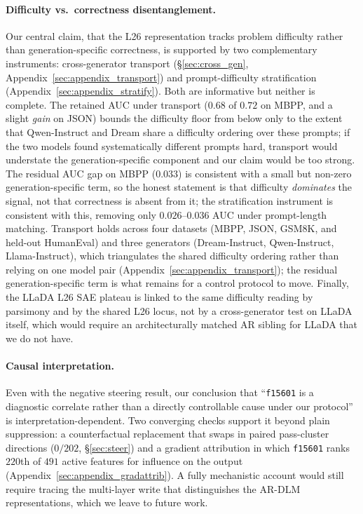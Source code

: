 \documentclass[11pt]{article}
\begin{document}
\paragraph{Difficulty vs.\ correctness disentanglement.}
Our central claim, that the L26 representation tracks problem difficulty rather than generation-specific correctness, is supported by two complementary instruments: cross-generator transport (\S\ref{sec:cross_gen}, Appendix~\ref{sec:appendix_transport}) and prompt-difficulty stratification (Appendix~\ref{sec:appendix_stratify}).
Both are informative but neither is complete.
The retained AUC under transport ($0.68$ of $0.72$ on MBPP, and a slight \emph{gain} on JSON) bounds the difficulty floor from below only to the extent that Qwen-Instruct and Dream share a difficulty ordering over these prompts; if the two models found systematically different prompts hard, transport would understate the generation-specific component and our claim would be too strong.
The residual AUC gap on MBPP ($0.033$) is consistent with a small but non-zero generation-specific term, so the honest statement is that difficulty \emph{dominates} the signal, not that correctness is absent from it; the stratification instrument is consistent with this, removing only $0.026$--$0.036$ AUC under prompt-length matching.
Transport holds across four datasets (MBPP, JSON, GSM8K, and held-out HumanEval) and three generators (Dream-Instruct, Qwen-Instruct, Llama-Instruct), which triangulates the shared difficulty ordering rather than relying on one model pair (Appendix~\ref{sec:appendix_transport}); the residual generation-specific term is what remains for a control protocol to move.
Finally, the LLaDA L26 SAE plateau is linked to the same difficulty reading by parsimony and by the shared L26 locus, not by a cross-generator test on LLaDA itself, which would require an architecturally matched AR sibling for LLaDA that we do not have.

\paragraph{Causal interpretation.}
Even with the negative steering result, our conclusion that ``\texttt{f15601} is a diagnostic correlate rather than a directly controllable cause under our protocol'' is interpretation-dependent.
Two converging checks support it beyond plain suppression: a counterfactual replacement that swaps in paired pass-cluster directions ($0/202$, \S\ref{sec:steer}) and a gradient attribution in which \texttt{f15601} ranks $220$th of $491$ active features for influence on the output (Appendix~\ref{sec:appendix_gradattrib}).
A fully mechanistic account would still require tracing the multi-layer write that distinguishes the AR-DLM representations, which we leave to future work.
\end{document}
